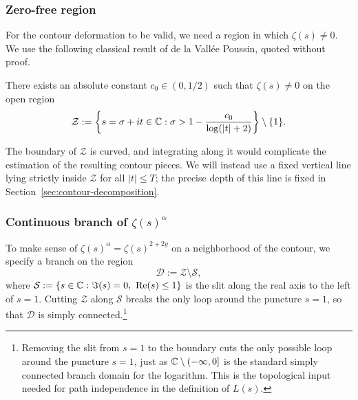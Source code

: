 \subsubsection*{Zero-free region}

For the contour deformation to be valid, we need a region in which
$\zeta(s) \neq 0$. We use the following classical result of
de la Vall\'ee Poussin, quoted without proof.

\begin{theorem}
\label{thm:zero-free}
There exists an absolute constant $c_0 \in (0, 1/2)$ such that
$\zeta(s) \neq 0$ on the open region
\begin{equation}\label{eq:zero-free-region}
    \mathcal{Z} := \left\{ s = \sigma + it \in \mathbb{C} :
    \sigma > 1 - \frac{c_0}{\log(|t| + 2)} \right\}
    \setminus \{1\}.
\end{equation}
\end{theorem}

The boundary of $\mathcal{Z}$ is curved, and integrating along
it would complicate the estimation of the resulting contour
pieces. We will instead use a fixed vertical line lying strictly
inside $\mathcal{Z}$ for all $|t| \leq T$; the precise depth of
this line is fixed in Section~\ref{sec:contour-decomposition}.

\subsubsection*{Continuous branch of \texorpdfstring{$\zeta(s)^\alpha$}{zeta(s)^alpha}}

To make sense of $\zeta(s)^\alpha = \zeta(s)^{2 + 2y}$ on a
neighborhood of the contour, we specify a branch on the region
\begin{equation}\label{eq:D-region}
    \mathcal{D} := \mathcal{Z} \setminus \mathcal{S},
\end{equation}
where $\mathcal{S} := \{s \in \mathbb{C} : \Im(s) = 0,\ \operatorname{Re}(s) \leq 1\}$
is the slit along the real axis to the left of $s = 1$. Cutting $\mathcal{Z}$ along $\mathcal{S}$ breaks the only loop around the puncture $s=1$, so that $\mathcal{D}$ is simply connected.\footnote{%
Removing the slit from $s=1$ to the boundary cuts the only
possible loop around the puncture $s=1$, just as
$\mathbb{C}\setminus(-\infty,0]$ is the standard simply connected branch
domain for the logarithm. This is the topological input needed
for path independence in the definition of $L(s)$.}

